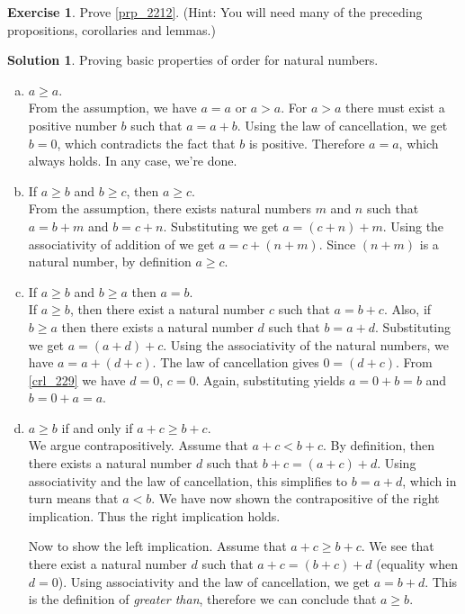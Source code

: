 \documentclass[a4paper, twocolumn]{report}
\newcounter{exercise} \numberwithin{exercise}{section}
\theoremstyle{definition}
\newtheorem{exc}[exercise]{Exercise}
\theoremstyle{solution}
\newtheorem*{sltn}{Solution}
\begin{document}
\begin{exc}
  Prove \ref{prp_2212}. (Hint: You will need many of the preceding propositions, corollaries and lemmas.)
\end{exc}
\begin{sltn}
  Proving basic properties of order for natural numbers.
  \begin{enumerate}[(a)]
    \item $a \geq a$. \\
      [0.2cm]
      From the assumption, we have $a = a$ or $a > a$. For $a > a$ there must
      exist a positive number $ b $ such that $a = a + b$. Using the law of
      cancellation, we get $b = 0$, which contradicts the fact that $b$ is
      positive. Therefore $a = a$, which always holds. In any case, we're done.

    \item If $a \geq b$ and $b \geq c$, then $a \geq c$.\\
      [0.2cm]
      From the assumption, there exists natural numbers $m$ and $n$ such that
      $a = b + m$ and $b = c + n$. Substituting we get $a = (c + n) + m$.
      Using the associativity of addition of we get $a = c + (n + m)$. Since
      $(n + m)$ is a natural number, by definition $ a \geq c$.

    \item If $a \geq b$ and $b \geq a$ then $a = b$. \\
      [0.2cm]
      If $a \geq b$, then there exist a natural number $c$ such that $a = b +
      c$.  Also, if $b \geq a$ then there exists a natural number $d$ such that
      $b = a + d$.  Substituting we get $a = (a + d) + c$. Using the
      associativity of the natural numbers, we have $a = a + (d + c)$. The law
      of cancellation gives $0 = (d + c)$. From \ref{crl_229} we have $d = 0$,
      $c = 0$.  Again, substituting yields $a = 0 + b = b$ and $b = 0 + a = a$.

    \item $a \geq b$ if and only if $a + c \geq b + c$.\\
      [0.2cm]
      We argue contrapositively.  Assume that $a + c < b + c$. By definition,
      then there exists a natural number $d$ such that $b + c = (a + c) + d$.
      Using associativity and the law of cancellation, this simplifies to $b =
      a + d$, which in turn means that $a < b$. We have now shown the
      contrapositive of the right implication. Thus the right implication holds.

      Now to show the left implication.  Assume that $a + c \geq b + c$. We see
      that there exist a natural number $d$ such that $a + c = (b + c) + d$
      (equality when $d = 0$). Using associativity and the law of
      cancellation, we get $a = b + d$.  This is the definition of
      \textit{greater than}, therefore we can conclude that $a \geq b$. 


\end{enumerate}
\end{sltn}
\end{document}
